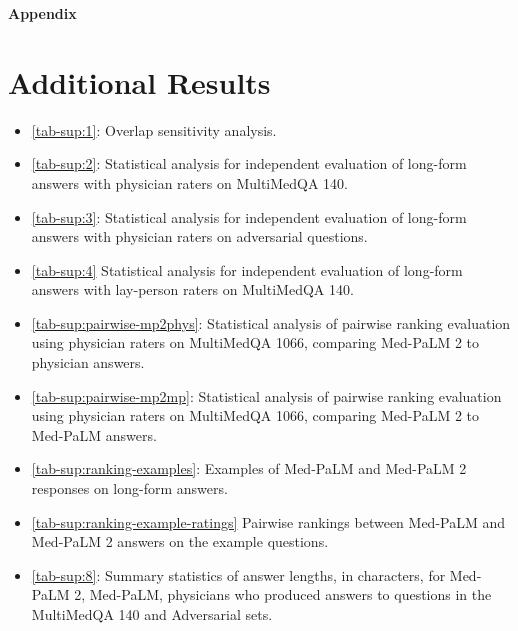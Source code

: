 
\clearpage


\renewcommand{\thesection}{A.\arabic{section}}
\renewcommand{\thefigure}{A.\arabic{figure}}
\renewcommand{\thetable}{A.\arabic{table}}
\renewcommand{\theequation}{A.\arabic{equation}}

\setcounter{section}{0}
\setcounter{figure}{0}
\setcounter{table}{0}
\setcounter{equation}{0}



\noindent \textbf{\LARGE{Appendix}}\\
\normalfont

\section{Additional Results}

\begin{itemize}[leftmargin=1.5em,rightmargin=0em]
\setlength\itemsep{5pt}

\item \cref{tab-sup:1}: Overlap sensitivity analysis.
\item \cref{tab-sup:2}: Statistical analysis for independent evaluation of long-form answers with physician raters on MultiMedQA 140.
\item \cref{tab-sup:3}: Statistical analysis for independent evaluation of long-form answers with physician raters on adversarial questions.
\item \cref{tab-sup:4} Statistical analysis for independent evaluation of long-form answers with lay-person raters on MultiMedQA 140.
\item \cref{tab-sup:pairwise-mp2phys}: Statistical analysis of pairwise ranking evaluation using physician raters on MultiMedQA 1066, comparing Med-PaLM 2 to physician answers.
\item \cref{tab-sup:pairwise-mp2mp}: Statistical analysis of pairwise ranking evaluation using physician raters on MultiMedQA 1066, comparing Med-PaLM 2 to Med-PaLM answers.
\item \cref{tab-sup:ranking-examples}: Examples of Med-PaLM and Med-PaLM 2 responses on long-form answers.
\item \cref{tab-sup:ranking-example-ratings} Pairwise rankings between Med-PaLM and Med-PaLM 2 answers on the example questions.
\item \cref{tab-sup:8}: Summary statistics of answer lengths, in characters, for Med-PaLM 2, Med-PaLM, physicians who produced answers to questions in the MultiMedQA 140 and Adversarial sets.
\end{itemize}

